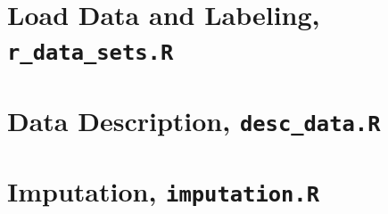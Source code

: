 \documentclass[../thesis.tex]{subfiles}
\begin{document}


\section{Load Data and Labeling, \texttt{r\_data\_sets.R}}
\label{sec:load_data}



\section{Data Description, \texttt{desc\_data.R}}
\label{sec:app_desc_stat}



\section{Imputation, \texttt{imputation.R}}
\label{sec:app_impu}
\end{document}
